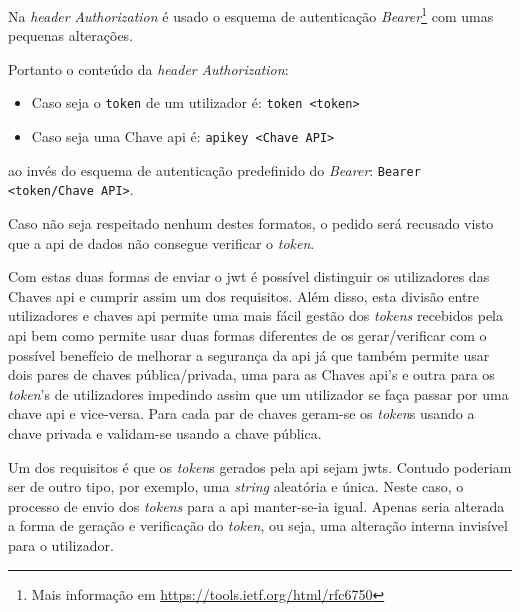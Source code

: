 Na \textit{header} \textit{Authorization} é usado o esquema de autenticação 
\textit{Bearer}\footnote{Mais informação em \url{https://tools.ietf.org/html/rfc6750}} 
com umas pequenas alterações. 

Portanto o conteúdo da \textit{header} \textit{Authorization}:
\begin{itemize}[leftmargin=2cm]
    \item Caso seja o \texttt{token} de um utilizador é:\newline
        \verb|token <token>|
    \item Caso seja uma Chave \acrshort{api} é:\newline
        \verb|apikey <Chave API>|
\end{itemize}

ao invés do esquema de autenticação predefinido do \textit{Bearer}: \verb|Bearer <token/Chave API>|.

Caso não seja respeitado nenhum destes formatos, o pedido será recusado visto que a \acrshort{api} de dados não 
consegue verificar o \textit{token}.

Com estas duas formas de enviar o \acrshort{jwt} é possível distinguir os utilizadores das Chaves \acrshort{api} 
e cumprir assim um dos requisitos. Além disso, esta divisão entre utilizadores e chaves \acrshort{api} permite 
uma mais fácil gestão dos \textit{tokens} recebidos pela \acrshort{api} bem como permite usar duas formas 
diferentes de os gerar/verificar com o possível benefício de melhorar a segurança da \acrshort{api} já que também 
permite usar dois pares de chaves pública/privada, uma para as Chaves \acrshort{api}'s e outra para os 
\textit{token}'s de utilizadores impedindo assim que um utilizador se faça passar por uma chave \acrshort{api} e 
vice-versa. Para cada par de chaves geram-se os \textit{token}s usando a chave privada e validam-se usando 
a chave pública.

Um dos requisitos é que os \textit{token}s gerados pela \acrshort{api} sejam \acrshort{jwt}s. 
Contudo poderiam ser de outro tipo, por exemplo, uma \textit{string} aleatória e única. Neste caso, o processo de envio 
dos \textit{tokens} para a \acrshort{api} manter-se-ia igual. Apenas seria alterada a forma de geração e 
verificação do \textit{token}, ou seja, uma alteração interna invisível para o utilizador.

